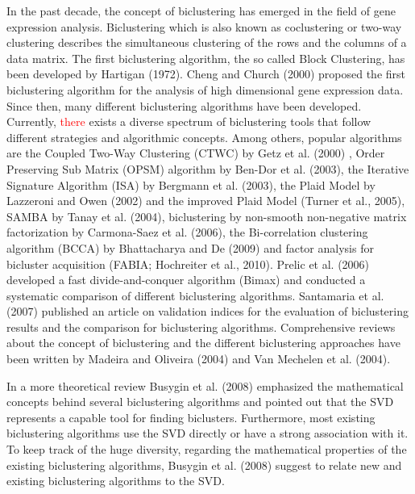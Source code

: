 \documentclass{bioinfo}
\begin{document}
In the past decade, the concept of biclustering has emerged in the field of gene expression analysis. Biclustering which is also known as coclustering or two-way clustering describes the simultaneous clustering of the rows and the columns of a data matrix. 
The first biclustering algorithm, the so called Block Clustering, has been developed by Hartigan (1972)\nocite{Hartigan1972}. 
Cheng and Church (2000)\nocite{Cheng2000} proposed the first biclustering algorithm for the analysis of high dimensional gene expression data.
Since then, many different biclustering algorithms have been developed. 
Currently, \textcolor{red}{there} exists a diverse spectrum of biclustering tools that follow different strategies and algorithmic concepts.
Among others, popular algorithms are the Coupled Two-Way Clustering (CTWC) by Getz et al. (2000) 
\nocite{Getz2000}, Order Preserving Sub Matrix (OPSM) algorithm by Ben-Dor et al. (2003)\nocite{BenDor2003}, %
the Iterative Signature Algorithm (ISA) by Bergmann et al. (2003)\nocite{Bergmann2003},
the Plaid Model by Lazzeroni and Owen (2002)\nocite{Lazzeroni2000} and the improved Plaid Model (Turner et al., 2005)\nocite{Turner2005}, SAMBA by Tanay et al. (2004)\nocite{Tanay2004}, biclustering by non-smooth non-negative matrix factorization by Carmona-Saez et al. (2006)\nocite{Carmona-Saez2006}, the Bi-correlation clustering algorithm (BCCA) by Bhattacharya and De (2009)\nocite{Bhattacharya2009} and factor analysis for bicluster acquisition (FABIA; Hochreiter et al., 2010)\nocite{Hochreiter2010}. Prelic et al. (2006)\nocite{Prelic2006} developed a fast divide-and-conquer algorithm (Bimax) and conducted a systematic comparison of different biclustering algorithms.
Santamaria et al. (2007)\nocite{Santamaria2007} published an article on validation indices for the evaluation of biclustering results and the comparison for biclustering algorithms. Comprehensive reviews about the concept of biclustering and the different biclustering approaches have been written by Madeira and Oliveira (2004)\nocite{Madeira2004} and Van Mechelen et al. (2004)\nocite{Mechelen2004}.

In a more theoretical review Busygin et al. (2008)\nocite{Busygin2008} emphasized the mathematical concepts behind several biclustering algorithms and pointed out that the SVD represents a capable tool for finding biclusters. Furthermore, most existing biclustering algorithms use the SVD directly or have a strong association with it. To keep track of the huge diversity, regarding the mathematical properties of the existing biclustering algorithms, Busygin et al. (2008) suggest to relate new and existing biclustering algorithms to the SVD. 
\end{document}

